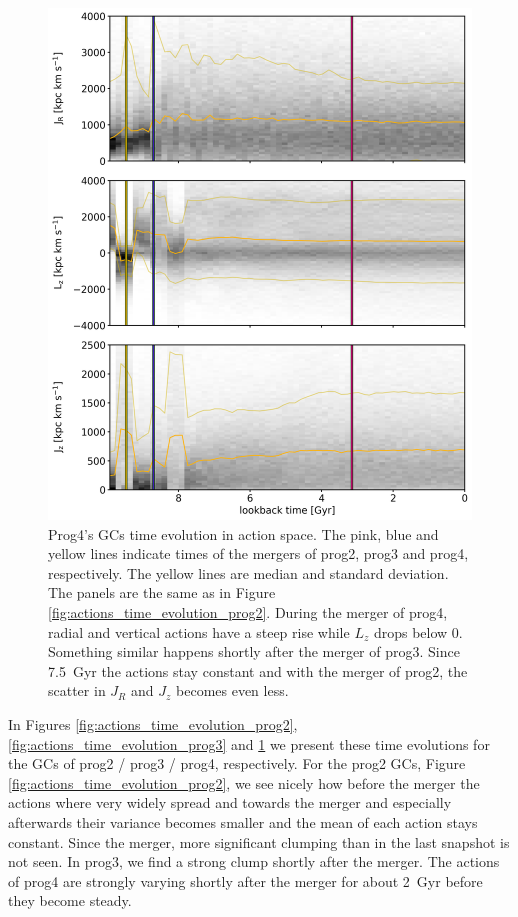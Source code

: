 \begin{figure}[htbp]
\captionsetup{format=plain}
    \centering
	\includegraphics[width=\textwidth]{plots/Dynamics/prog4/action_time_evolution_wodisk_hist_mean.png}
    \caption{Prog4's \acp{GC} time evolution in action space. The pink, blue and yellow lines indicate times of the mergers of prog2, prog3 and prog4, respectively. The yellow lines are median and standard deviation. The panels are the same as in Figure \ref{fig:actions_time_evolution_prog2}. During the merger of prog4, radial and vertical actions have a steep rise while $L_z$ drops below 0. Something similar happens shortly after the merger of prog3. Since \SI{7.5}{Gyr} the actions stay constant and with the merger of prog2, the scatter in $J_R$ and $J_z$ becomes even less.}\label{fig:actions_time_evolution_prog4}
\end{figure}
In Figures \ref{fig:actions_time_evolution_prog2}, \ref{fig:actions_time_evolution_prog3} and \ref{fig:actions_time_evolution_prog4} we present these time evolutions for the \acp{GC} of prog2 / prog3 / prog4, respectively. For the prog2 \acp{GC}, Figure \ref{fig:actions_time_evolution_prog2}, we see nicely how before the merger the actions where very widely spread and towards the merger and especially afterwards their variance becomes smaller and the mean of each action stays constant. Since the merger, more significant clumping than in the last snapshot is not seen. In prog3, we find a strong clump shortly after the merger. The actions of prog4 are strongly varying shortly after the merger for about \SI{2}{Gyr} before they become steady.

